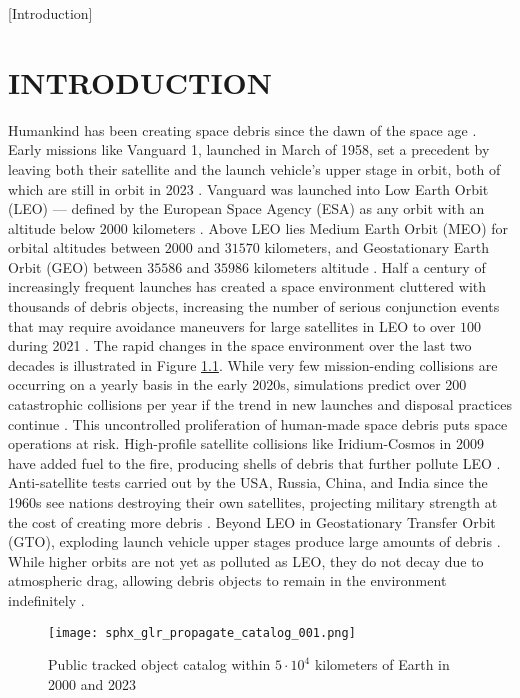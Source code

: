 [Introduction]
\graphicspath{{/Users/liamrobinson/Documents/PyLightCurves/docs/build/html/_images}}

\chapter{INTRODUCTION}

Humankind has been creating space debris since the dawn of the space age \cite{esareport2022}. Early missions like Vanguard 1, launched in March of 1958, set a precedent by leaving both their satellite and the launch vehicle's upper stage in orbit, both of which are still in orbit in 2023 \cite{vanguard1}. Vanguard was launched into Low Earth Orbit (LEO) --- defined by the European Space Agency (ESA) as any orbit with an altitude below $2000$ kilometers \cite{esareport2022}. Above LEO lies Medium Earth Orbit (MEO) for orbital altitudes between $2000$ and $31570$ kilometers, and Geostationary Earth Orbit (GEO) between $35586$ and $35986$ kilometers altitude \cite{esareport2022}. Half a century of increasingly frequent launches has created a space environment cluttered with thousands of debris objects, increasing the number of serious conjunction events that may require avoidance maneuvers for large satellites in LEO to over $100$ during 2021 \cite{esareport2022}. The rapid changes in the space environment over the last two decades is illustrated in Figure \ref{fig:catalog_comparison}. While very few mission-ending collisions are occurring on a yearly basis in the early 2020s, simulations predict over 200 catastrophic collisions per year if the trend in new launches and disposal practices continue \cite{esareport2022}. This uncontrolled proliferation of human-made space debris puts space operations at risk. High-profile satellite collisions like Iridium-Cosmos in 2009 have added fuel to the fire, producing shells of debris that further pollute LEO \cite{vallado4ed}. Anti-satellite tests carried out by the USA, Russia, China, and India since the 1960s see nations destroying their own satellites, projecting military strength at the cost of creating more debris \cite{vallado4ed}. Beyond LEO in Geostationary Transfer Orbit (GTO), exploding launch vehicle upper stages produce large amounts of debris \cite{esareport2022}. While higher orbits are not yet as polluted as LEO, they do not decay due to atmospheric drag, allowing debris objects to remain in the environment indefinitely \cite{vallado4ed}.

\begin{figure}[ht]
    \centering
    \texttt{[image: sphx\_glr\_propagate\_catalog\_001.png]}
    \caption{Public tracked object catalog within $5 \cdot 10^4$ kilometers of Earth in 2000 and 2023}
    \label{fig:catalog_comparison}
\end{figure}


